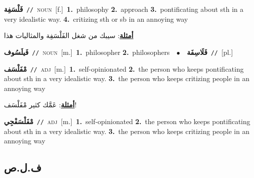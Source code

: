 \documentclass[10pt,a4paper,twoside]{article} %
\begin{document}
\begin{multicols}{2}
{\setlength\topsep{0pt}\textbf{\foreignlanguage{arabic}{فَلْسَفِة}}\ {\color{gray}\texttt{//}\color{black}}\ \textsc{noun}\ [f.]\ \textbf{1.}~philosophy  \textbf{2.}~approach  \textbf{3.}~pontificating about sth in a very idealistic way.  \textbf{4.}~critizing sth or sb in an annoying way\  \begin{flushright}\color{gray}\foreignlanguage{arabic}{\textbf{\underline{\foreignlanguage{arabic}{أمثلة}}}: سيبك من شغل الفَلْسَفِة والمثاليات هذا}\end{flushright}\color{black}} \vspace{2mm}

{\setlength\topsep{0pt}\textbf{\foreignlanguage{arabic}{فَيلَسُوف}}\ {\color{gray}\texttt{//}\color{black}}\ \textsc{noun}\ [m.]\ \textbf{1.}~philosopher  \textbf{2.}~philosophers\ \ $\bullet$\ \ \setlength\topsep{0pt}\textbf{\foreignlanguage{arabic}{فَلَاسِفَة}}\ {\color{gray}\texttt{//}\color{black}}\ [pl.]\ } \vspace{2mm}

{\setlength\topsep{0pt}\textbf{\foreignlanguage{arabic}{مْفَلْسَف}}\ {\color{gray}\texttt{//}\color{black}}\ \textsc{adj}\ [m.]\ \textbf{1.}~self-opinionated  \textbf{2.}~the person who keeps pontificating about sth in a very idealistic way.  \textbf{3.}~the person who keeps critizing people in an annoying way\  \begin{flushright}\color{gray}\foreignlanguage{arabic}{\textbf{\underline{\foreignlanguage{arabic}{أمثلة}}}: عَمَّك كثير مْفَلْسَف!}\end{flushright}\color{black}} \vspace{2mm}

{\setlength\topsep{0pt}\textbf{\foreignlanguage{arabic}{مْفَلْسَفْجِي}}\ {\color{gray}\texttt{//}\color{black}}\ \textsc{adj}\ [m.]\ \textbf{1.}~self-opinionated  \textbf{2.}~the person who keeps pontificating about sth in a very idealistic way.  \textbf{3.}~the person who keeps critizing people in an annoying way\ } \vspace{2mm}

\vspace{-3mm}
\subsection*{\color{blue}\foreignlanguage{arabic}{ف.ل.ص}\color{blue}{}} 


\end{multicols}
\end{document}

